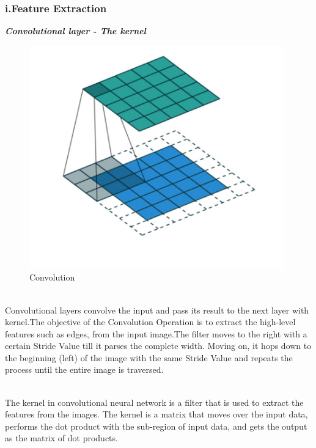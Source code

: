\subsubsection{i.Feature Extraction} 
\textbf{\emph{Convolutional layer - The kernel}}
\begin{figure}[h]
\label{ss}
\includegraphics[width= 11cm]{Convolution.jpeg}
\caption{Convolution}
\end{figure}
\\  Convolutional layers convolve the input and pass its result to the next layer with kernel.The objective of the Convolution Operation is to extract the high-level features such as edges, from the input image.The filter moves to the right with a certain Stride Value till it parses the complete width. Moving on, it hops down to the beginning (left) of the image with the same Stride Value and repeats the process until the entire image is traversed.

\\The kernel in convolutional neural network is a filter that is used to extract the features from the images. The kernel is a matrix that moves over the input data, performs the dot product with the sub-region of input data, and gets the output as the matrix of dot products.\\

